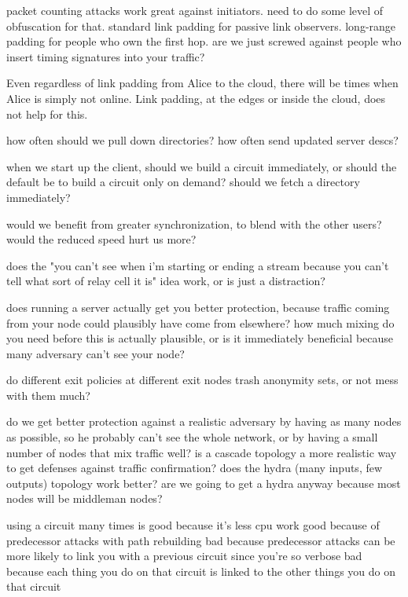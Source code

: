 \documentclass[times,10pt,twocolumn]{article}
\begin{document}
\label{sec:maintaining-anonymity}

packet counting attacks work great against initiators. need to do some
level of obfuscation for that. standard link padding for passive link
observers. long-range padding for people who own the first hop. are
we just screwed against people who insert timing signatures into your
traffic?

Even regardless of link padding from Alice to the cloud, there will be
times when Alice is simply not online. Link padding, at the edges or
inside the cloud, does not help for this.

how often should we pull down directories? how often send updated
server descs?

when we start up the client, should we build a circuit immediately,
or should the default be to build a circuit only on demand? should we
fetch a directory immediately?

would we benefit from greater synchronization, to blend with the other
users? would the reduced speed hurt us more?

does the "you can't see when i'm starting or ending a stream because
you can't tell what sort of relay cell it is" idea work, or is just
a distraction?

does running a server actually get you better protection, because traffic
coming from your node could plausibly have come from elsewhere? how
much mixing do you need before this is actually plausible, or is it
immediately beneficial because many adversary can't see your node?

do different exit policies at different exit nodes trash anonymity sets,
or not mess with them much?

do we get better protection against a realistic adversary by having as
many nodes as possible, so he probably can't see the whole network,
or by having a small number of nodes that mix traffic well? is a
cascade topology a more realistic way to get defenses against traffic
confirmation? does the hydra (many inputs, few outputs) topology work
better? are we going to get a hydra anyway because most nodes will be
middleman nodes?

using a circuit many times is good because it's less cpu work
  good because of predecessor attacks with path rebuilding
  bad because predecessor attacks can be more likely to link you with a
    previous circuit since you're so verbose
  bad because each thing you do on that circuit is linked to the other
    things you do on that circuit
\end{document}
